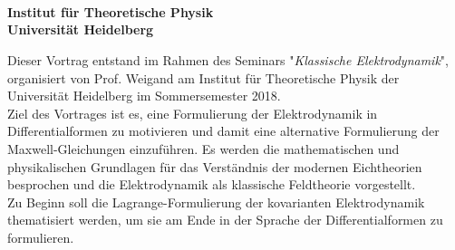 \begin{center}

	\makeatletter
	\thispagestyle{plain}
	\LARGE\textbf{\@title} \\
	\vspace{2mm}
	\large\bfseries{\@author} \\
	\normalfont
	\vspace{2mm}
	\large{\@date} \\
	\vspace{2mm}
	\large{Institut für Theoretische Physik \\
		Universität Heidelberg} \\
	\makeatother
\end{center}

\normalsize

Dieser Vortrag entstand im Rahmen des Seminars "\textit{Klassische Elektrodynamik}", organisiert von Prof. Weigand am Institut für Theoretische Physik der Universität Heidelberg im Sommersemester 2018. \\
Ziel des Vortrages ist es, eine Formulierung der Elektrodynamik in Differentialformen zu motivieren und damit eine alternative Formulierung der Maxwell-Gleichungen einzuführen. Es werden die mathematischen und physikalischen Grundlagen für das Verständnis der modernen Eichtheorien besprochen und die Elektrodynamik als klassische Feldtheorie vorgestellt. \\
Zu Beginn soll die Lagrange-Formulierung der kovarianten Elektrodynamik thematisiert werden, um sie am Ende in der Sprache der Differentialformen zu formulieren.
